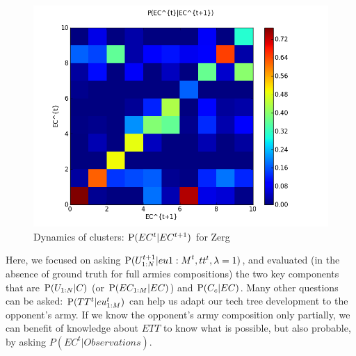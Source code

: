 
\begin{figure}[htp]
\centerline{\includegraphics[width=0.55\columnwidth]{images/Z_EC_knowing_ECnext.png}}
\caption{Dynamics of clusters: $\mathrm{P}(EC^t|EC^{t+1})$ for Zerg}
\label{ecknowingecnext}
\end{figure}

Here, we focused on asking $\mathrm{P}(U_{1:N}^{t+1}|eu{1:M}^t, tt^t, \lambda=1)$, and evaluated (in the absence of ground truth for full armies compositions) the two key components that are $\mathrm{P}(U_{1:N}|C)$ (or $\mathrm{P}(EC_{1:M}|EC)$) and $\mathrm{P}(C_c|EC)$. Many other questions can be asked: $\mathrm{P}(TT^t|eu_{1:M}^t)$ can help us adapt our tech tree development to the opponent's army. If we know the opponent's army composition only partially, we can benefit of knowledge about $ETT$ to know what is possible, but also probable, by asking $P(EC^t|Observations)$.


